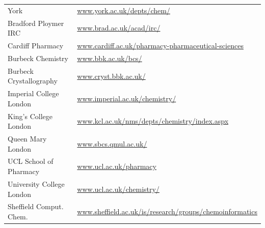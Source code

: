 \begin{table}[H]
\begin{tabular}{||p{4cm}|Y||}
 \footnotesize{York                          }     & \footnotesize{\url{www.york.ac.uk/depts/chem/}}                                                                                                   \\ 
 \footnotesize{Bradford Ploymer IRC         }      & \footnotesize{\url{www.brad.ac.uk/acad/irc/}}                                                                                                      \\
 \footnotesize{Cardiff Pharmacy            }       & \footnotesize{\url{www.cardiff.ac.uk/pharmacy-pharmaceutical-sciences}}                                                                            \\
 \footnotesize{Burbeck Chemistry          }        & \footnotesize{\url{www.bbk.ac.uk/bcs/}}                                                                                                            \\
 \footnotesize{Burbeck Crystallography   }         & \footnotesize{\url{www.cryst.bbk.ac.uk/}}                                                                                                          \\
 \footnotesize{Imperial College London  }          & \footnotesize{\url{www.imperial.ac.uk/chemistry/}}                                                                                                 \\
 \footnotesize{King's College London   }          & \footnotesize{\url{www.kcl.ac.uk/nms/depts/chemistry/index.aspx}}                                                                                  \\
 \footnotesize{Queen Mary London      }            & \footnotesize{\url{www.sbcs.qmul.ac.uk/}}                                                                                                          \\
 \footnotesize{UCL School of Pharmacy}             & \footnotesize{\url{www.ucl.ac.uk/pharmacy}}                                                                                                        \\
 \footnotesize{University College London}          & \footnotesize{\url{www.ucl.ac.uk/chemistry/}}                                                                                                      \\
 \footnotesize{Sheffield Comput. Chem.}  & \footnotesize{\url{www.sheffield.ac.uk/is/research/groups/chemoinformatics}}   
 \\
 \hline
\end{tabular}
\end{table}

